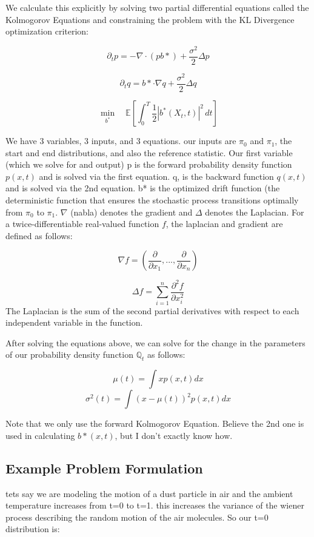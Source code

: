 \documentclass[12pt]{article}
\begin{document}
We calculate this explicitly by solving two partial differential equations called the Kolmogorov Equations and constraining the problem with the KL Divergence optimization criterion:

\[\partial_tp = -\nabla \cdot (pb*) + \frac{\sigma^2}{2}\Delta p\]

\[\partial_tq = b* \cdot \nabla q +\frac{\sigma^2}{2}\Delta q\]

\[\underset{b^*}{\min}\quad \mathbb{E}\left[\int_0^T \frac{1}{2}|b^*(X_t, t)|^2\, dt\right]\]



We have 3 variables, 3 inputs, and 3 equations. our inputs are \(\pi_0\) and \(\pi_1\), the start and end distributions, and also the reference statistic. Our first variable (which we solve for and output) p is the forward probability density function \(p(x,t)\) and is solved via the first equation. q, is the backward function \(q(x,t)\) and is solved via the 2nd equation. b* is the optimized drift function (the deterministic function that ensures the stochastic process transitions optimally from \(\pi_0\) to \(\pi_1\). \(\nabla\) (nabla) denotes the gradient and \(\Delta\) denotes the Laplacian. For a twice-differentiable real-valued function \(f\), the laplacian and gradient are defined as follows:

\[\nabla f = \left(\frac{\partial}{\partial x_1}, ... , \frac{\partial}{\partial x_n}\right)\]

\[\Delta f = \sum_{i=1}^n\frac{\partial^2f}{\partial x_i^2}\]
The Laplacian is the sum of the second partial derivatives with respect to each independent variable in the function.

After solving the equations above, we can solve for the change in the parameters of our probability density function \(\mathbb{Q}_t\) as follows:

\[\mu(t) = \int x p(x,t)dx\]
\[\sigma^2(t)=\int(x - \mu(t))^2p(x,t)dx\]

Note that we only use the forward Kolmogorov Equation. Believe the 2nd one is used in calculating \(b*(x,t)\), but I don't exactly know how. 

\subsection{Example Problem Formulation}
tets say we are modeling the motion of a dust particle in air and the ambient temperature increases from t=0 to t=1. this increases the variance of the wiener process describing the random motion of the air molecules. So our t=0 distribution is:
\end{document}

